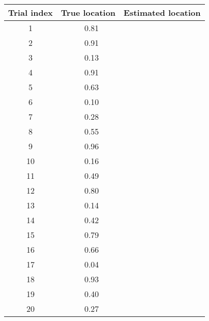\begin{enumerate}
\begin{enumerate}
\begin{table}[h]
\centering
    \begin{tabular}{|c|c|c|}
    \hline Trial index & True location & Estimated location  \\ \hline
    1           & ~       0.81        	  &    \\ \hline
    2           & ~       0.91             &    \\ \hline
    3           & ~       0.13             &    \\ \hline
    4           & ~       0.91             &    \\ \hline
    5           & ~       0.63             &    \\ \hline
    6           & ~       0.10             &    \\ \hline
    7           & ~       0.28             &    \\ \hline
    8           & ~       0.55             &    \\ \hline
    9           & ~       0.96             &    \\ \hline
    10          & ~       0.16             &    \\ \hline
    11          & ~       0.49             &    \\ \hline
    12          & ~       0.80             &    \\ \hline
    13          & ~       0.14             &    \\ \hline
    14          & ~       0.42             &    \\ \hline
    15          & ~       0.79             &    \\ \hline
    16          & ~       0.66             &    \\ \hline
    17          & ~       0.04             &    \\ \hline
    18          & ~       0.93             &    \\ \hline
    19          & ~       0.40             &    \\ \hline
    20          & ~       0.27             &    \\ \hline
    \end{tabular}
\end{table}

\end{enumerate} 

\end{enumerate}

\newpage

